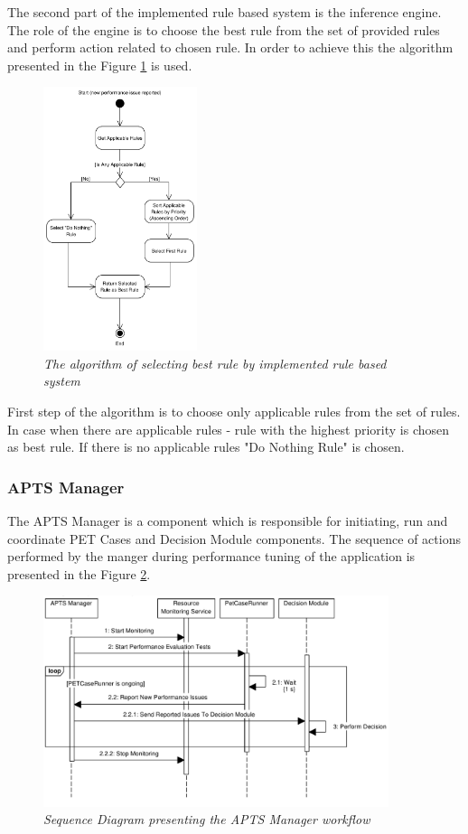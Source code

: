 \documentclass[12pt,a4paper]{article}
\begin{document}
The second part of the implemented rule based system is the inference engine. The role of the engine is to choose the best rule from the set of provided rules and perform action related to chosen rule. In order to achieve this the algorithm presented in the Figure \ref{dmalgorithm} is used. 

\begin{figure}[!htb]
\centering
\includegraphics[width=0.4\textwidth]{DecisionModuleActivityDiagram}
\caption{\textit{The algorithm of selecting best rule by implemented rule based system}} \label{dmalgorithm}
\end{figure}

First step of the algorithm is to choose only applicable rules from the set of rules. In case when there are applicable rules - rule with the highest priority is chosen as best rule. If there is no applicable rules "Do Nothing Rule" is chosen.

\subsubsection{APTS Manager} \label{manager}

The APTS Manager is a component which is responsible for initiating, run and coordinate PET Cases and Decision Module components. The sequence of actions performed by the manger during performance tuning of the application is presented in the Figure \ref{manager}.

\begin{figure}[!htb]
\centering
\includegraphics[width=0.9\textwidth]{ManagerSequenceDiagram}
\caption{\textit{Sequence Diagram presenting the APTS Manager workflow}} \label{manager}
\end{figure}
\end{document}
